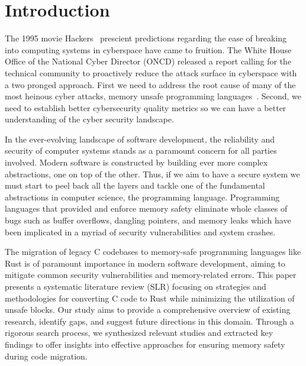 \documentclass[sigconf]{acmart}
\begin{document}


\maketitle

\section{Introduction}

The 1995 movie Hackers~\cite{Wikipedia_contributors2024-zr} prescient predictions regarding the ease
of breaking into computing systems in cyberspace have came to fruition. The White House Office of
the National Cyber Director (ONCD) released a report calling for the technical community to
proactively reduce the attack surface in cyberspace with a two pronged approach. First we need to
address the root cause of many of the most heinous cyber attacks, memory unsafe programming
languages~\cite{United_States_Gov2024-pp}. Second, we need to establish better cybersecurity quality
metrics so we can have a better understanding of the cyber security landscape.

In the ever-evolving landscape of software development, the reliability and security of computer
systems stands as a paramount concern for all parties involved. Modern software is constructed by
building ever more complex abstractions, one on top of the other. Thus, if we aim to have a secure
system we must start to peel back all the layers and tackle one of the fundamental abstractions in
computer science, the programming language. Programming languages that provided and enforce memory
safety eliminate whole classes of bugs such as buffer overflows, dangling pointers, and memory leaks
which have been implicated in a myriad of security vulnerabilities and system crashes.

The migration of legacy C codebases to memory-safe programming languages like Rust is of paramount
importance in modern software development, aiming to mitigate common security vulnerabilities and
memory-related errors. This paper presents a systematic literature review (SLR) focusing on
strategies and methodologies for converting C code to Rust while minimizing the utilization of
unsafe blocks. Our study aims to provide a comprehensive overview of existing research, identify
gaps, and suggest future directions in this domain. Through a rigorous search process, we
synthesized relevant studies and extracted key findings to offer insights into effective approaches
for ensuring memory safety during code migration.
\end{document}
